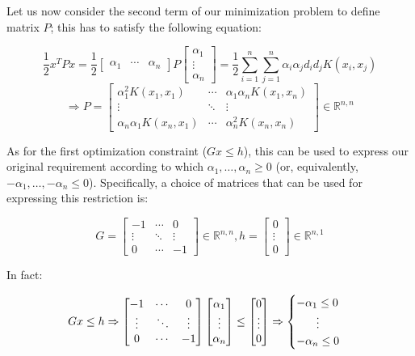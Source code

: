 \documentclass[letterpaper,headings=standardclasses]{scrartcl}
\begin{document}
Let us now consider the second term of our minimization problem to define matrix $P$; this has to satisfy the following equation:

$$ \frac{1}{2} x^T P x = \frac{1}{2} \left[ \begin{matrix} \alpha_1 & \cdots & \alpha_n \end{matrix} \right] P \left[ \begin{matrix} \alpha_1 \\ \vdots \\ \alpha_n \end{matrix} \right] = \frac{1}{2} \sum_{i = 1}^n \sum_{j = 1}^n \alpha_i \alpha_j d_i d_j K(x_i, x_j) $$
$$ \Rightarrow P = \left[ \begin{matrix} \alpha_1^2 K(x_1, x_1) & \cdots & \alpha_1 \alpha_n K(x_1, x_n) \\ \vdots & \ddots & \vdots \\ \alpha_n \alpha_1 K(x_n, x_1) & \cdots & \alpha_n^2 K(x_n, x_n) \end{matrix} \right] \in \mathbb{R}^{n,n} $$

As for the first optimization constraint ($Gx \le h$), this can be used to express our original requirement according to which $\alpha_1, \dots, \alpha_n \ge 0$ (or, equivalently, $-\alpha_1, \dots, -\alpha_n \le 0$). Specifically, a choice of matrices that can be used for expressing this restriction is:

$$ G = \left[ \begin{matrix} -1 & \cdots & 0 \\ \vdots & \ddots & \vdots \\ 0 & \cdots & -1 \end{matrix} \right] \in \mathbb{R}^{n,n}, h = \left[ \begin{matrix} 0 \\ \vdots \\ 0 \end{matrix} \right] \in \mathbb{R}^{n,1} $$

In fact:

$$ Gx \le h \Rightarrow \left[ \begin{matrix} -1 & \cdots & 0 \\ \vdots & \ddots & \vdots \\ 0 & \cdots & -1 \end{matrix} \right] \left[ \begin{matrix} \alpha_1 \\ \vdots \\ \alpha_n \end{matrix} \right] \le \left[ \begin{matrix} 0 \\ \vdots \\ 0 \end{matrix} \right] \Rightarrow \begin{cases} -\alpha_1 \le 0 \\ \hfil \vdots \\ -\alpha_n \le 0 \end{cases} $$
\end{document}
